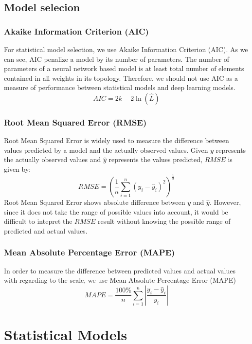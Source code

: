 \documentclass[12pt]{article}
\begin{document}
\subsection{Model selecion}
\subsubsection{Akaike Information Criterion (AIC)}
For statistical model selection, we use Akaike Information Criterion (AIC). 
As we can see, AIC penalize a model by its number of parameters. The
number of parameters of a neural network based model is at least total number of
elements contained in all weights in its topology. Therefore, we should not use
AIC as a measure of performance between statistical models and deep learning
models.
$$
AIC = 2k -2\ln(\hat{L})
$$

\subsubsection{Root Mean Squared Error (RMSE)}
Root Mean Squared Error is widely used to measure the difference between values
predicted by a model and the actually observed values. Given $y$ represents the
actually observed values and $\hat{y}$ represents the values predicted, $RMSE$
is given by:
$$
RMSE = \left( \frac{1}{n}\sum _{i=1}^{n}(y_i -\hat{y}_i)^2 \right)^\frac{1}{2}
$$
Root Mean Squared Error shows absolute difference between $y$ and $\hat{y}$.
However, since it does not take the range of possible values into account, it
would be difficult to intepret the $RMSE$ result without knowing the possible
range of predicted and actual values. 

\subsubsection{Mean Absolute Percentage Error (MAPE)}
In order to measure the difference between predicted values and actual values
with regarding to the scale, we use Mean Absolute Percentage Error (MAPE)
$$
MAPE = \frac{100\%}{n}\sum  _{i=1}^{n}\left| \frac{y_i -\hat{y}_i}{y_i} \right|
$$


\section{Statistical Models}
\end{document}
